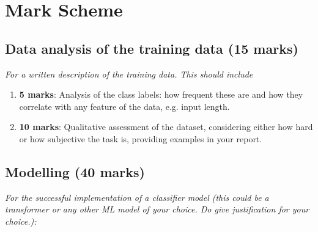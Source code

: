 \documentclass[11pt]{article}
\begin{document}


\appendix

\section{Mark Scheme}

\subsection{Data analysis of the training data \textbf{(15 marks)}}

\emph{For a written description of the training data. This should include}

\begin{enumerate}
    \item \textbf{5 marks}: Analysis of the class labels: how frequent these are and how they correlate with any feature of the data, e.g. input length.
    \item \textbf{10 marks}: Qualitative assessment of the dataset, considering either how hard or how subjective the task is, providing examples in your report.
\end{enumerate}

\subsection{Modelling \textbf{(40 marks)}}

\emph{For the successful implementation of a classifier model (this could be a transformer or any other ML model of your choice. Do give justification for your choice.):}
\end{document}
